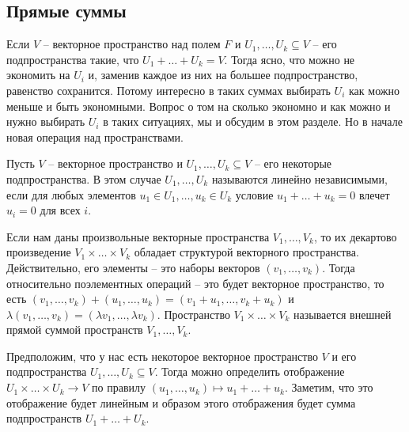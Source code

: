 \subsection{Прямые суммы}

Если $V$ -- векторное пространство над полем $F$ и $U_1,\ldots,U_k\subseteq V$ -- его подпространства такие, что $U_1 + \ldots + U_k = V$.
Тогда ясно, что можно не экономить на $U_i$ и, заменив каждое из них на большее подпространство, равенство сохранится.
Потому интересно в таких суммах выбирать $U_i$ как можно меньше и быть экономными.
Вопрос о том на сколько экономно и как можно и нужно выбирать $U_i$ в таких ситуациях, мы и обсудим в этом разделе.
Но в начале новая операция над пространствами.

\begin{definition}
\label{def::IndepSpaces}
Пусть $V$ -- векторное пространство и $U_1,\ldots,U_k\subseteq V$ -- его некоторые подпространства.
В этом случае $U_1,\ldots, U_k$ называются линейно независимыми, если для любых элементов $u_1\in U_1, \ldots, u_k\in U_k$ условие $u_1 + \ldots + u_k = 0$ влечет $u_i = 0$ для всех $i$.
\end{definition}

\begin{definition}
Если нам даны произвольные векторные пространства $V_1,\ldots, V_k$, то их декартово произведение $V_1\times\ldots\times V_k$ обладает структурой векторного пространства.
Действительно, его элементы -- это наборы векторов $(v_1,\ldots,v_k)$.
Тогда относительно поэлементных операций -- это будет векторное пространство, то есть
$(v_1,\ldots,v_k) + (u_1,\ldots,u_k) = (v_1 + u_1,\ldots,v_k + u_k)$ и $\lambda(v_1,\ldots,v_k) = (\lambda v_1, \ldots, \lambda v_k)$.
Пространство $V_1\times\ldots \times V_k$ называется внешней прямой суммой пространств $V_1,\ldots, V_k$.
\end{definition}

Предположим, что у нас есть некоторое векторное пространство $V$ и его подпространства $U_1,\ldots,U_k\subseteq V$. Тогда можно определить отображение $U_1\times \ldots \times U_k \to V$ по правилу $(u_1,\ldots,u_k) \mapsto u_1 + \ldots + u_k$. Заметим, что это отображение будет линейным и образом этого отображения будет сумма подпространств $U_1 + \ldots + U_k$.

